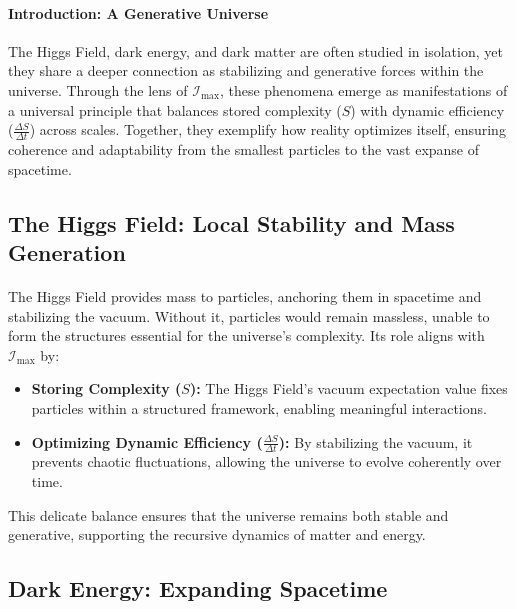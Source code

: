 \documentclass[12pt]{article}
\begin{document}
\paragraph{Introduction: A Generative Universe}
The Higgs Field, dark energy, and dark matter are often studied in isolation, yet they share a deeper connection as stabilizing and generative forces within the universe. Through the lens of \(\mathcal{I}_{\text{max}}\), these phenomena emerge as manifestations of a universal principle that balances stored complexity (\(S\)) with dynamic efficiency (\(\frac{\Delta S}{\Delta t}\)) across scales. Together, they exemplify how reality optimizes itself, ensuring coherence and adaptability from the smallest particles to the vast expanse of spacetime.

\subsection{The Higgs Field: Local Stability and Mass Generation}
\paragraph{}
The Higgs Field provides mass to particles, anchoring them in spacetime and stabilizing the vacuum. Without it, particles would remain massless, unable to form the structures essential for the universe’s complexity. Its role aligns with \(\mathcal{I}_{\text{max}}\) by:
\begin{itemize}
    \item \textbf{Storing Complexity (\(S\)):} The Higgs Field’s vacuum expectation value fixes particles within a structured framework, enabling meaningful interactions.
    \item \textbf{Optimizing Dynamic Efficiency (\(\frac{\Delta S}{\Delta t}\)):} By stabilizing the vacuum, it prevents chaotic fluctuations, allowing the universe to evolve coherently over time.
\end{itemize}
This delicate balance ensures that the universe remains both stable and generative, supporting the recursive dynamics of matter and energy.

\subsection{Dark Energy: Expanding Spacetime}
\end{document}
